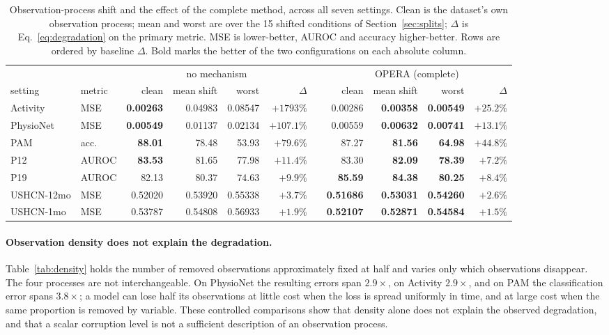 \begin{table}[t]
\caption{Observation-process shift and the effect of the complete method, across all seven settings\prelim.
Clean is the dataset's own observation process; mean and worst are over the 15 shifted conditions of
Section~\ref{sec:splits}; $\Delta$ is Eq.~\ref{eq:degradation} on the primary metric. MSE is lower-better,
AUROC and accuracy higher-better. Rows are ordered by baseline $\Delta$. Bold marks the better of the two
configurations on each absolute column.}
\label{tab:main}
\small
\begin{tabular}{llrrrrcrrrr}
\toprule
 &  & \multicolumn{4}{c}{no mechanism} & & \multicolumn{4}{c}{OPERA (complete)} \\
\cmidrule(lr){3-6}\cmidrule(lr){8-11}
setting & metric & clean & mean shift & worst & $\Delta$ & & clean & mean shift & worst & $\Delta$ \\
\midrule
Activity     & MSE   & \textbf{0.00263} & 0.04983 & 0.08547 & $+1793\%$ & & 0.00286 & \textbf{0.00358} & \textbf{0.00549} & $+25.2\%$ \\
PhysioNet    & MSE   & \textbf{0.00549} & 0.01137 & 0.02134 & $+107.1\%$ & & 0.00559 & \textbf{0.00632} & \textbf{0.00741} & $+13.1\%$ \\
PAM          & acc.  & \textbf{88.01} & 78.48 & 53.93 & $+79.6\%$ & & 87.27 & \textbf{81.56} & \textbf{64.98} & $+44.8\%$ \\
P12          & AUROC & \textbf{83.53} & 81.65 & 77.98 & $+11.4\%$ & & 83.30 & \textbf{82.09} & \textbf{78.39} & $+7.2\%$ \\
P19          & AUROC & 82.13 & 80.37 & 74.63 & $+9.9\%$ & & \textbf{85.59} & \textbf{84.38} & \textbf{80.25} & $+8.4\%$ \\
USHCN-12mo   & MSE   & 0.52020 & 0.53920 & 0.55338 & $+3.7\%$ & & \textbf{0.51686} & \textbf{0.53031} & \textbf{0.54260} & $+2.6\%$ \\
USHCN-1mo    & MSE   & 0.53787 & 0.54808 & 0.56933 & $+1.9\%$ & & \textbf{0.52107} & \textbf{0.52871} & \textbf{0.54584} & $+1.5\%$ \\
\bottomrule
\end{tabular}
\end{table}

\paragraph{Observation density does not explain the degradation.}
Table~\ref{tab:density} holds the number of removed observations approximately fixed at half and varies only which
observations disappear. The four processes are not interchangeable. On PhysioNet the resulting errors span
$2.9\times$, on Activity $2.9\times$, and on PAM the classification error spans $3.8\times$; a model can lose half
its observations at little cost when the loss is spread uniformly in time, and at large cost when the same
proportion is removed by variable. These controlled comparisons show that density alone does not explain the
observed degradation, and that a scalar corruption level is not a sufficient description of an observation process.

